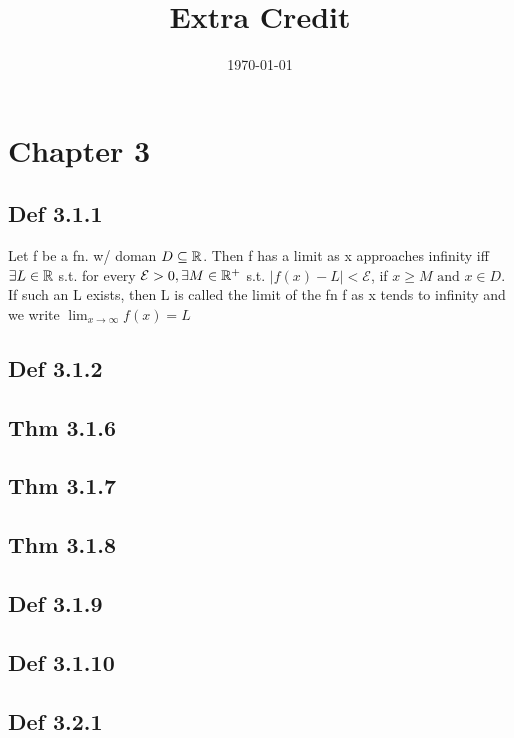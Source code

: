 

\title{Extra Credit} %
\author{}
\date{\today} %



\maketitle

\section*{Chapter 3}

\subsection*{Def 3.1.1}
    Let f be a fn. w/ doman $D \subseteq \mathbb{R}$. Then f has a limit as x approaches infinity iff $\exists L \in \mathbb{R}$ s.t. for every $\mathcal{E} > 0, \exists M \in \mathbb{R}^+$ s.t. $|f(x) - L| < \mathcal{E}$, if $x \ge M \text{ and } x \in D$.
    If such an L exists, then L is called the limit of the fn f as x tends to infinity and we write $\lim_{x \to \infty} f(x) = L$

\subsection*{Def 3.1.2}

\subsection*{Thm 3.1.6}

\subsection*{Thm 3.1.7}

\subsection*{Thm 3.1.8}

\subsection*{Def 3.1.9}

\subsection*{Def 3.1.10}

\subsection*{Def 3.2.1}

